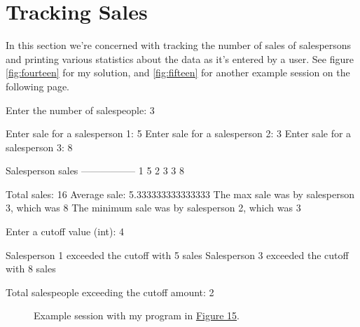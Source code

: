 \documentclass[leqno, 11pt]{article}
\begin{document}
\section*{Tracking Sales}
In this section we're concerned with tracking the number of sales of salespersons and printing various statistics about the data as it's entered by a user. See figure \autoref{fig:fourteen} for my solution, and \autoref{fig:fifteen} for another example session on the following page.
\begin{verbbox}[\mbox{}\scriptsize]
Enter the number of salespeople: 3

Enter sale for a salesperson 1: 5
Enter sale for a salesperson 2: 3
Enter sale for a salesperson 3: 8

Salesperson sales
-----------------
1    5
2    3
3    8

Total sales: 16
Average sale: 5.333333333333333
The max sale was by salesperson 3, which was 8
The minimum sale was by salesperson 2, which was 3

Enter a cutoff value (int): 4

Salesperson 1 exceeded the cutoff with 5 sales
Salesperson 3 exceeded the cutoff with 8 sales

Total salespeople exceeding the cutoff amount: 2
\end{verbbox}
\begin{figure}[h!]
  \centering
  \vspace{0.5cm}
  \theverbbox
  \caption{Example session with my program in \hyperref[fig:fourteen]{Figure 15}.}
  \label{fig:fifteen}
\end{figure}
\end{document}
